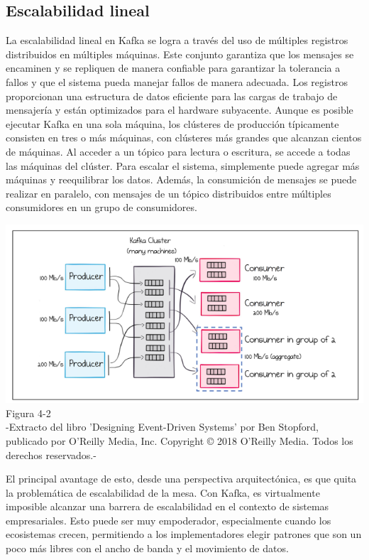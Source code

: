 \documentclass{article}
\begin{document}
\subsection{Escalabilidad lineal}
 La escalabilidad lineal en Kafka se logra a través del uso de múltiples registros distribuidos en múltiples máquinas. Este conjunto garantiza que los mensajes se encaminen y se repliquen de manera confiable para garantizar la tolerancia a fallos y que el sistema pueda manejar fallos de manera adecuada. Los registros proporcionan una estructura de datos eficiente para las cargas de trabajo de mensajería y están optimizados para el hardware subyacente. Aunque es posible ejecutar Kafka en una sola máquina, los clústeres de producción típicamente consisten en tres o más máquinas, con clústeres más grandes que alcanzan cientos de máquinas. Al acceder a un tópico para lectura o escritura, se accede a todas las máquinas del clúster. Para escalar el sistema, simplemente puede agregar más máquinas y reequilibrar los datos. Además, la consumición de mensajes se puede realizar en paralelo, con mensajes de un tópico distribuidos entre múltiples consumidores en un grupo de consumidores.

\begin{center}
    \includegraphics[scale=0.8]{figure4.2.png}
    Figura 4-2\\
    -Extracto del libro 'Designing Event-Driven Systems' por Ben Stopford, publicado por O'Reilly Media, Inc. Copyright © 2018 O'Reilly Media. Todos los derechos reservados.-
\end{center}

El principal avantage de esto, desde una perspectiva arquitectónica, es que quita la problemática de escalabilidad de la mesa. Con Kafka, es virtualmente imposible alcanzar una barrera de escalabilidad en el contexto de sistemas empresariales. Esto puede ser muy empoderador, especialmente cuando los ecosistemas crecen, permitiendo a los implementadores elegir patrones que son un poco más libres con el ancho de banda y el movimiento de datos.\\
\end{document}
